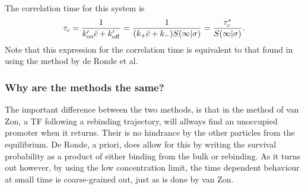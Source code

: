 The correlation time for this system is
\begin{equation}
 \tau_c = \frac{1}{k'_{\rm on} \bar{c} + k'_{\rm off}} = \frac{1}{ (k_+ \bar{c} + k_- ) S(\infty|\sigma) } = \frac{\tau_c^*}{S(\infty|\sigma)}.
\end{equation}
Note that this expression for the correlation time is equivalent to that found in  using the method by de Ronde et al. 

\subsubsection{Why are the methods the same?}
The important difference between the two methods, is that in the method of van Zon, a TF following a rebinding trajectory, will allways find an unoccupied promoter when it returns. Their is no hindrance by the other particles from the equilibrium. De Ronde, a priori, does allow for this by writing the survival probability as a product of either binding from the bulk or rebinding. As it turns out however, by using the low concentration limit, the time dependent behaviour at small time is coarse-grained out, just as is done by van Zon.

